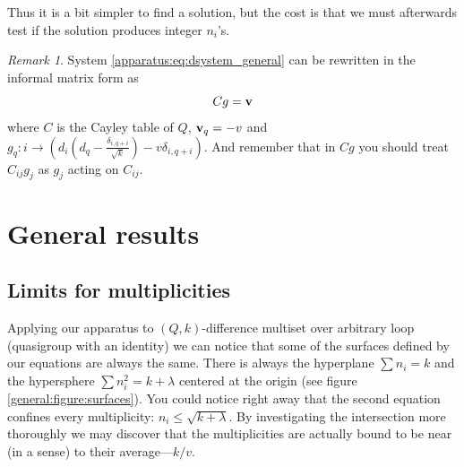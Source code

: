 \documentclass{article}
\theoremstyle{plain}
\theoremstyle{definition}
\theoremstyle{remark}
\newtheorem{remark}[theorem]{Remark}
\begin{document}
		Thus it is a bit simpler to find a solution, but the cost is that we must afterwards test if the solution produces integer $n_i$'s.
		
		\begin{remark}
            System \eqref{apparatus:eq:dsystem_general} can be rewritten in the informal matrix form as
            \begin{equation}
                \label{apparatus:eq:dmatrixform}
                Cg=\bf v
            \end{equation}
            where $C$ is the Cayley table of $Q$, ${\bf v}_q = -v$ and $g_q: i \rightarrow (d_i (d_q - \frac{\delta_{i,q+i}}{\sqrt k}) -v\delta_{i,q+i})$. And remember that in $Cg$ you should treat $C_{ij}g_j$ as $g_j$ acting on $C_{ij}$.
		\end{remark}
		
    \section{General results}
        \subsection{Limits for multiplicities}
            Applying our apparatus to $(Q,k)$-difference multiset over arbitrary loop (quasigroup with an identity) we can notice that some of the surfaces defined by our equations are always the same. There is always the hyperplane $\sum {n_i} = k$ and the hypersphere $\sum n_i^2 = k + \lambda$ centered at the origin (see figure \ref{general:figure:surfaces}). You could notice right away that the second equation confines every multiplicity: $n_i \leq \sqrt{k+\lambda}$. By investigating the intersection more thoroughly we may discover that the multiplicities are actually bound to be near (in a sense) to their average---$k/v$.
\end{document}
